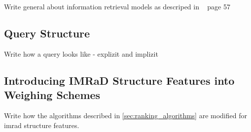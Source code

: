 Write general about information retrieval models as descriped in ~\cite{ModernInvormationRetrieval1999} page 57

\subsection{Query Structure}

Write how a query looks like - explizit and implizit

\subsection{Introducing IMRaD Structure Features into Weighing Schemes}

Write how the algorithms described in \cref{sec:ranking_algorithms} are modified for imrad structure features.
